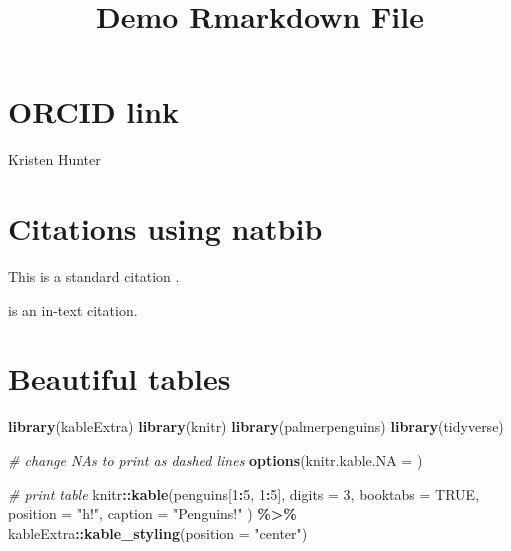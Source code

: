 \documentclass[
]{article}
\title{Demo Rmarkdown File}
\author{}
\date{\vspace{-2.5em}}
\newenvironment{Shaded}{\begin{snugshade}}{\end{snugshade}}
\newcommand{\AttributeTok}[1]{\textcolor[rgb]{0.13,0.29,0.53}{#1}}
\newcommand{\CommentTok}[1]{\textcolor[rgb]{0.56,0.35,0.01}{\textit{#1}}}
\newcommand{\ConstantTok}[1]{\textcolor[rgb]{0.56,0.35,0.01}{#1}}
\newcommand{\DecValTok}[1]{\textcolor[rgb]{0.00,0.00,0.81}{#1}}
\newcommand{\FunctionTok}[1]{\textcolor[rgb]{0.13,0.29,0.53}{\textbf{#1}}}
\newcommand{\NormalTok}[1]{#1}
\newcommand{\SpecialCharTok}[1]{\textcolor[rgb]{0.81,0.36,0.00}{\textbf{#1}}}
\newcommand{\StringTok}[1]{\textcolor[rgb]{0.31,0.60,0.02}{#1}}
\begin{document}
\maketitle

\begin{Shaded}
\end{Shaded}

\section{ORCID link}\label{orcid-link}

Kristen Hunter

\section{Citations using natbib}\label{citations-using-natbib}

This is a standard citation \citep{Raudenbush2002}.

\citet{Spybrook2014} is an in-text citation.

\section{Beautiful tables}\label{beautiful-tables}

\begin{Shaded}
\begin{Highlighting}[]
\FunctionTok{library}\NormalTok{(kableExtra)}
\FunctionTok{library}\NormalTok{(knitr)}
\FunctionTok{library}\NormalTok{(palmerpenguins)}
\FunctionTok{library}\NormalTok{(tidyverse)}

\CommentTok{\# change NAs to print as dashed lines}
\FunctionTok{options}\NormalTok{(}\AttributeTok{knitr.kable.NA =} \StringTok{\textquotesingle{}{-}\textquotesingle{}}\NormalTok{)}

\CommentTok{\# print table}
\NormalTok{knitr}\SpecialCharTok{::}\FunctionTok{kable}\NormalTok{(penguins[}\DecValTok{1}\SpecialCharTok{:}\DecValTok{5}\NormalTok{, }\DecValTok{1}\SpecialCharTok{:}\DecValTok{5}\NormalTok{], }\AttributeTok{digits =} \DecValTok{3}\NormalTok{, }\AttributeTok{booktabs =} \ConstantTok{TRUE}\NormalTok{, }
             \AttributeTok{position =} \StringTok{"h!"}\NormalTok{, }
             \AttributeTok{caption =} \StringTok{"Penguins!"}\NormalTok{ ) }\SpecialCharTok{\%\textgreater{}\%}
\NormalTok{  kableExtra}\SpecialCharTok{::}\FunctionTok{kable\_styling}\NormalTok{(}\AttributeTok{position =} \StringTok{"center"}\NormalTok{)}
\end{Highlighting}
\end{Shaded}
\end{document}
